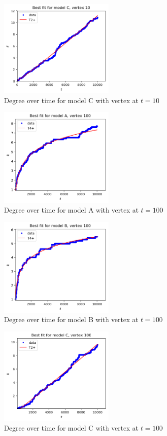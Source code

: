 \documentclass[a4paper]{article}
\begin{document}
%
\begin{figure}[H]
		\centering
		\includegraphics[width=0.5\textwidth]{modelC/best_dt10.png}
		\caption{Degree over time for model C with vertex at $t=10$}
\end{figure}
%
\begin{figure}[H]
    \centering
		\includegraphics[width=0.5\textwidth]{modelA/best_dt100.png}
		\caption{Degree over time for model A with vertex at $t=100$}
\end{figure}
%
\begin{figure}[H]
    \centering
		\includegraphics[width=0.5\textwidth]{modelB/best_dt100.png}
		\caption{Degree over time for model B with vertex at $t=100$}
\end{figure}
%
\begin{figure}[H]
		\centering
		\includegraphics[width=0.5\textwidth]{modelC/best_dt100.png}
		\caption{Degree over time for model C with vertex at $t=100$}
\end{figure}
\end{document}
